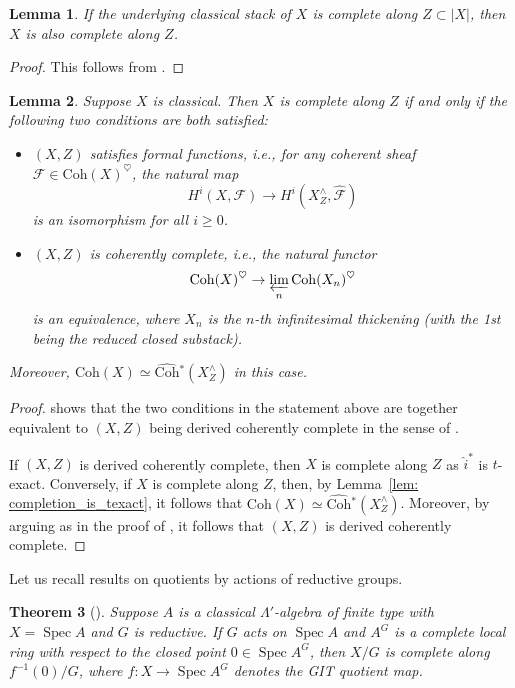 \documentclass{amsart}
\newtheorem{theorem}{Theorem}[subsection]
\newtheorem{lemma}[theorem]{Lemma}
\theoremstyle{definition}
\theoremstyle{remark}
\numberwithin{equation}{section}
\DeclareMathOperator{\Spec}{Spec}
\newcommand{\mc}{\mathcal}
\newcommand{\wh}{\widehat}
\newcommand{\Coh}{\mathrm{Coh}}
\begin{document}
\begin{lemma}\label{lem: completeness_reduction_to_classical}
If the underlying classical stack of $X$ is complete along $Z\subset \lvert X\rvert$, then $X$ is also complete along $Z$. 
\end{lemma}

\begin{proof}
This follows from \cite[Lemma 2.3.4]{HalpernLeistnerPreygel}. 
\end{proof}

\begin{lemma}\label{lem: reduction_to_formalfunctions}
Suppose $X$ is classical. Then $X$ is complete along $Z$ if and only if the following two conditions are both satisfied:
\begin{itemize}
    \item $(X, Z)$ satisfies \emph{formal functions}, i.e., for any coherent sheaf $\mc F\in \Coh(X)^\heartsuit$, the natural map
    \[
    H^i (X, \mc F) \to H^i (X^\wedge_Z, \wh{\mc F})
    \]
    is an isomorphism for all $i\geq 0$. 
    \item $(X, Z)$ is \emph{coherently complete}, i.e., the natural functor
    \[
    \Coh (X)^\heartsuit \to \varprojlim_n \Coh(X_n)^\heartsuit
    \]
    is an equivalence, where $X_n$ is the $n$-th infinitesimal thickening (with the 1st being the reduced closed substack).  
\end{itemize}
Moreover, $\Coh(X)\simeq \wh{\Coh}{}^*(X^\wedge_Z)$ in this case.
\end{lemma}

\begin{proof}
\cite[Proposition 3.5]{AlperHallLim} shows that the two conditions in the statement above are together equivalent to $(X,Z)$ being derived coherently complete in the sense of \cite[Definition 3.2]{AlperHallLim}. 

If $(X, Z)$ is derived coherently complete, then $X$ is complete along $Z$ as $\wh{i}^*$ is $t$-exact.
Conversely, if $X$ is complete along $Z$, then, by Lemma~\ref{lem: completion_is_texact}, it follows that $\Coh(X)\simeq \wh{\Coh}{}^*(X^\wedge_Z)$. Moreover, by arguing as in the proof of \cite[Proposition 3.5]{AlperHallLim}, it follows that $(X, Z)$ is derived coherently complete.
\end{proof}

Let us recall results on quotients by actions of reductive groups. 

\begin{theorem}[{\cite{HalpernLeistnerPreygel}}]\label{thm: completeness_along_fiber}
Suppose $A$ is a classical $\Lambda'$-algebra of finite type with $X=\Spec A$ and $G$ is reductive. If $G$ acts on $\Spec A$ and $A^G$ is a complete local ring with respect to the closed point $0\in \Spec A^G$, then $X/ G$ is complete along $f^{-1}(0)/G$, where $f\colon X\to \Spec A^G$ denotes the GIT quotient map. 
\end{theorem}
\end{document}
